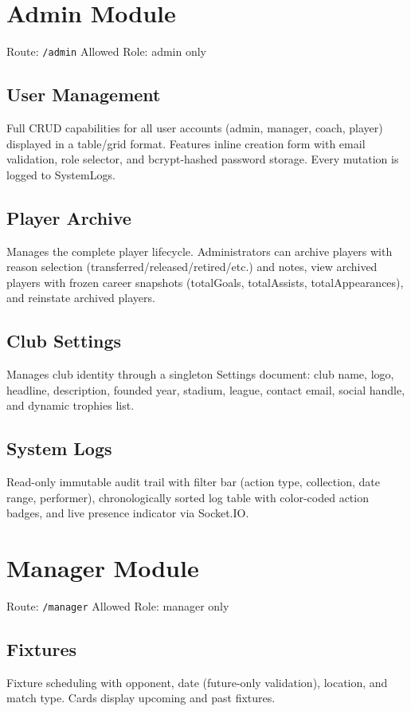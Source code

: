 \documentclass[12pt,a4paper,oneside]{report}
\begin{document}
\section{Admin Module}

Route: \texttt{/admin} \quad Allowed Role: admin only

\subsection{User Management}
Full CRUD capabilities for all user accounts (admin, manager, coach, player) displayed in a table/grid format. Features inline creation form with email validation, role selector, and bcrypt-hashed password storage. Every mutation is logged to SystemLogs.

\subsection{Player Archive}
Manages the complete player lifecycle. Administrators can archive players with reason selection (transferred/released/retired/etc.) and notes, view archived players with frozen career snapshots (totalGoals, totalAssists, totalAppearances), and reinstate archived players.

\subsection{Club Settings}
Manages club identity through a singleton Settings document: club name, logo, headline, description, founded year, stadium, league, contact email, social handle, and dynamic trophies list.

\subsection{System Logs}
Read-only immutable audit trail with filter bar (action type, collection, date range, performer), chronologically sorted log table with color-coded action badges, and live presence indicator via Socket.IO.

\section{Manager Module}

Route: \texttt{/manager} \quad Allowed Role: manager only

\subsection{Fixtures}
Fixture scheduling with opponent, date (future-only validation), location, and match type. Cards display upcoming and past fixtures.
\end{document}
